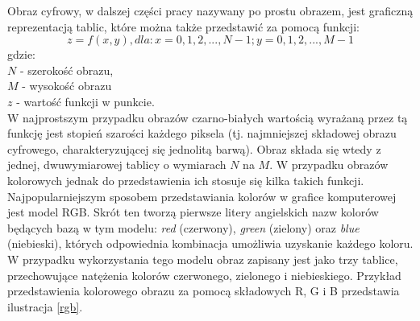 Obraz cyfrowy, w dalszej części pracy nazywany po prostu obrazem, jest graficzną reprezentacją tablic, które można także przedstawić za pomocą funkcji:
\begin{equation}
\label{funkcja_obrazu}
z = f(x,y), dla: x = 0, 1, 2, ..., N-1; y = 0, 1, 2, ..., M-1
\end{equation}
gdzie:\\
$N$ - szerokość obrazu,\\
$M$ - wysokość obrazu\\
$z$ - wartość funkcji w punkcie.\\
W najprostszym przypadku obrazów czarno-białych wartością wyrażaną przez tą funkcję jest stopień szarości każdego piksela (tj. najmniejszej składowej obrazu cyfrowego, charakteryzującej się jednolitą barwą). Obraz składa się wtedy z jednej, dwuwymiarowej tablicy o wymiarach $N$ na $M$.
W przypadku obrazów kolorowych jednak do przedstawienia ich stosuje się kilka takich funkcji. Najpopularniejszym sposobem przedstawiania kolorów w grafice komputerowej jest model RGB. Skrót ten tworzą pierwsze litery angielskich nazw kolorów będących bazą w tym modelu: \textit{red} (czerwony), \textit{green} (zielony) oraz \textit{blue} (niebieski), których odpowiednia kombinacja umożliwia uzyskanie każdego koloru. W przypadku wykorzystania tego modelu obraz zapisany jest jako trzy tablice, przechowujące natężenia kolorów czerwonego, zielonego i niebieskiego. Przykład przedstawienia kolorowego obrazu za pomocą składowych R, G i B przedstawia ilustracja \ref{rgb}.

